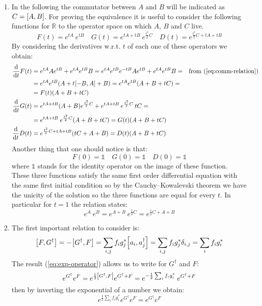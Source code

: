 \documentclass[11pt, oneside]{article}   	%
\begin{document}
\begin{enumerate}[label=\alph*)]
\item In the following the commutator between $A$ and $B$ will be indicated as $C = \comm{A}{B}$. For proving the equivalence it is useful to consider the following functions for $\mathbb{R}$ to the operator space on which $A$, $B$ and $C$ live.
\[
	F(t) = e^{tA} \: e^{tB} \quad G(t) = e^{tA + tB} \: e^{\frac{t^2}{2}C} \quad D(t) = e^{\frac{t^2}{2}C + tA+tB}
\]
By considering the derivatives w.r.t. $t$ of each one of these operators we obtain:
\begin{align*}
	\dv{t} F(t) &= e^{tA} A e^{tB} + e^{tA} e^{tB} B =  e^{tA} e^{tB} e^{-tB} A e^{tB} + e^{tA} e^{tB} B = && \text{from (\ref{eq:comm-relation})} \\
	&= e^{tA} e^{tB} \qty( A + t\comm{-B}{A} + B) = e^{tA} e^{tB} \qty(A + B + tC) =\\
	&= F(t) \qty( A + B + tC ) \\
	\dv{t} G(t) &= e^{tA + tB} (A + B) e^{\frac{t^2}{2}C} + e^{tA + tB}\: e^{\frac{t^2}{2}C} \:tC = \\
	&= e^{tA + tB} \: e^{\frac{t^2}{2}C} \qty(A + B +tC) = G(t) \qty(A + B +tC) \\
	\dv{t} D(t) &= e^{\frac{t^2}{2}C + tA+tB} \qty(tC+ A +B) = D(t) \qty(A + B + tC)
\end{align*}
Another thing that one should notice is that:
\[
	F(0) = \mathds{1} \quad G(0) = \mathds{1} \quad D(0) = \mathds{1}
\]
where $\mathds{1}$ stands for the identity operator on the image of these function. These three functions satisfy the same first order differential equation with the same first initial condition so by the Cauchy–Kowalevski theorem we have the unicity of the solution so the three functions are equal for every $t$. In particular for $t=1$ the relation states:
\[
	e^{A} \: e^{B} = e^{A + B} \: e^{\frac{1}{2}C} = e^{\frac{1}{2}C + A+B} \label{eq:exp-operator} \tag{$\spadesuit$}
\]

\item The first important relation to consider is:
\[
	\comm{F}{G^\dagger} = -\comm{G^\dagger}{F} = \sum_{i,j} f_i g_j^* \comm{a_i}{a_j^\dagger} =  \sum_{i,j} f_i g_j^* \delta_{i, j} = \sum_{i} f_i g_i^*
\]
The result (\ref{eq:exp-operator}) allows us to write for $G^\dagger$ and $F$:
\[
	e^{G^\dagger} e^{F} = e^{\frac{1}{2} \comm{G^\dagger}{F}} e^{G^\dagger + F} = e^{-\frac{1}{2} \sum_i f_i g_i^*} \:e^{G^\dagger + F}
\]
then by inverting the exponential of a number we obtain:
\[
	e^{\frac{1}{2} \sum_i f_i g_i^*} e^{G^\dagger} e^{F} = e^{G^\dagger} e^{F}
\]


\end{enumerate}
\end{document}
